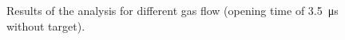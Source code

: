 \begin{figure}
{ }
 \hfill
 \caption{Results of the analysis for different gas flow (opening time of \SI{3.5}{\micro\second} without target).}
 \label{fig:elio_d}
\end{figure}

